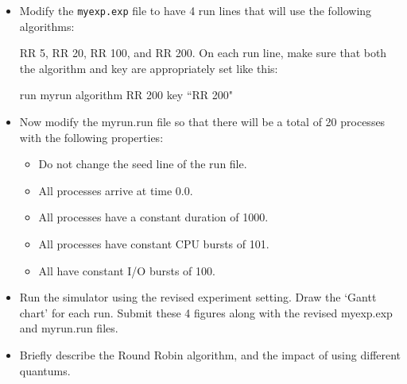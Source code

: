 \documentclass[16pt]{article}
\begin{document}
\begin{itemize}
\item Modify the \texttt{myexp.exp} file to have 4 run lines that will use the following
algorithms:

RR 5, RR 20, RR 100, and RR 200. On each run line, make sure that both the
algorithm and key are appropriately set like this:

run myrun algorithm RR 200 key ``RR 200"

\item Now modify the myrun.run file so that there will be a total of 20 processes with
the following properties:

\begin{itemize}
\item Do not change the seed line of the run file.
\item All processes arrive at time 0.0.
\item All processes have a constant duration of 1000.
\item All processes have constant CPU bursts of 101.
\item All have constant I/O bursts of 100.
\end{itemize}

\item Run the simulator using the revised experiment setting. Draw the `Gantt chart' for each run. Submit these 4 figures along with the revised myexp.exp and myrun.run files.

\item Briefly describe the Round Robin algorithm, and the impact of using different quantums.

\end{itemize}
\end{document}
